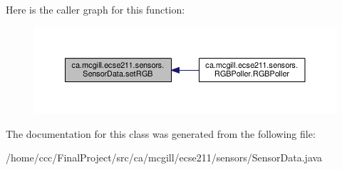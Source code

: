 Here is the caller graph for this function\+:
\nopagebreak
\begin{figure}[H]
\begin{center}
\leavevmode
\includegraphics[width=350pt]{classca_1_1mcgill_1_1ecse211_1_1sensors_1_1_sensor_data_ae5e2528566b53218673ebc1ae4683204_icgraph}
\end{center}
\end{figure}


The documentation for this class was generated from the following file\+:\begin{DoxyCompactItemize}
\item 
/home/ccc/\+Final\+Project/src/ca/mcgill/ecse211/sensors/Sensor\+Data.\+java\end{DoxyCompactItemize}
